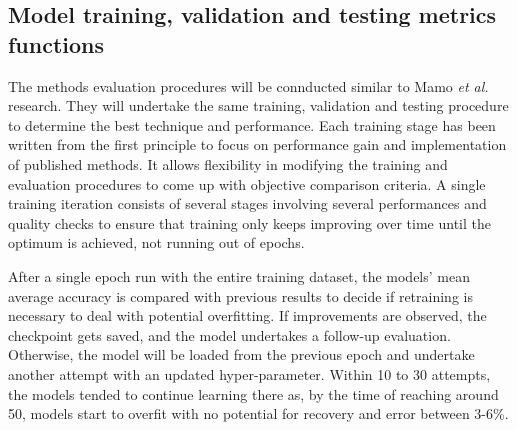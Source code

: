 \subsection{Model training, validation and testing metrics functions}
%
The methods evaluation procedures will be connducted similar to Mamo \textit{et al.}~\cite{mamo_long_2020} research.
They will undertake the same training, validation and testing procedure to determine the best technique and performance.
Each training stage has been written from the first principle to focus on performance gain and implementation of published methods.
It allows flexibility in modifying the training and evaluation procedures to come up with objective comparison criteria.
A single training iteration consists of several stages involving several performances and quality checks to ensure that training only keeps improving over time until the optimum is achieved, not running out of epochs.

%
After a single epoch run with the entire training dataset, the models' mean average accuracy is compared with previous results to decide if retraining is necessary to deal with potential overfitting.
If improvements are observed, the checkpoint gets saved, and the model undertakes a follow-up evaluation.
Otherwise, the model will be loaded from the previous epoch and undertake another attempt with an updated hyper-parameter.
Within 10 to 30 attempts, the models tended to continue learning there as, by the time of reaching around 50, models start to overfit with no potential for recovery and error between 3-6\%.

